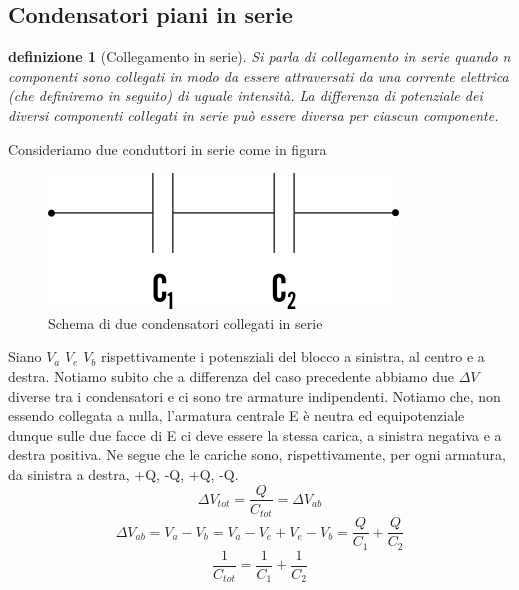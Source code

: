 \documentclass[10pt,a4paper]{article}
\newtheorem{definizione}{definizione}
\begin{document}
\subsection*{Condensatori piani in serie}
\begin{definizione}[Collegamento in serie]
	Si parla di collegamento in serie quando n componenti sono collegati in modo da essere attraversati da una corrente elettrica (che definiremo in seguito) di uguale intensità. La differenza di potenziale dei diversi componenti collegati in serie può essere diversa per ciascun componente.
\end{definizione}
Consideriamo due conduttori in serie come in figura
\begin{figure}[h!]
	\centering
	\includegraphics[width=0.6\linewidth]{images/Condensatori_serie}
	\caption{Schema di due condensatori collegati in serie}
	\label{fig:condensatoriserie}
\end{figure}
\FloatBarrier
Siano \(V_a\) \(V_e\) \(V_b\) rispettivamente i potensziali del blocco a sinistra, al centro e a destra. Notiamo subito che a differenza del caso precedente abbiamo due \(\Delta V\) diverse tra i condensatori e ci sono tre armature indipendenti. Notiamo che, non essendo collegata a nulla, l'armatura centrale E è neutra ed equipotenziale dunque sulle due facce di E ci deve essere la stessa carica, a sinistra negativa e a destra positiva. Ne segue che le cariche sono, rispettivamente, per ogni armatura, da sinistra a destra, +Q, -Q, +Q, -Q. 
\[\Delta V_{tot} = \frac{Q}{C_{tot}} = \Delta V_{ab}\]
\[\Delta V_{ab} = V_a-V_b=V_a-V_e+V_e-V_b = \frac{Q}{C_1}+\frac{Q}{C_2}\]
\[\frac{1}{C_{tot}} = \frac{1}{C_1} + \frac{1}{C_2}\]
\end{document}
